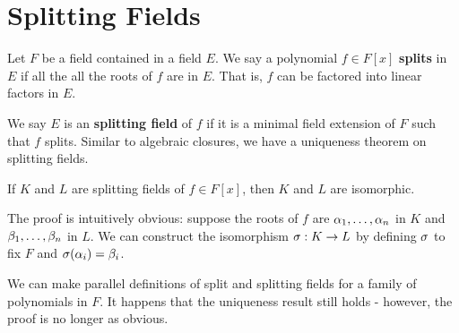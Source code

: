 \section{Splitting Fields}
Let $F$ be a field contained in a field $E$. We say a polynomial $f \in F[x]$ \textbf{splits} in $E$ if all the all the roots of $f$ are in $E$. That is, $f$ can be factored into linear factors in $E$.

We say $E$ is an \textbf{splitting field} of $f$ if it is a minimal field extension of $F$ such that $f$ splits. Similar to algebraic closures, we have a uniqueness theorem on splitting fields.
\begin{center}
    If $K$ and $L$ are splitting fields of $f \in F[x]$, then $K$ and $L$ are isomorphic.
\end{center}
The proof is intuitively obvious: suppose the roots of $f$ are $\alpha_1, \dots, \alpha_n$ in $K$ and $\beta_1, \dots, \beta_n$ in $L$. We can construct the isomorphism $\sigma: K \rightarrow L$ by defining $\sigma$ to fix $F$ and $\sigma(\alpha_i) = \beta_i$.

We can make parallel definitions of split and splitting fields for a family of polynomials in $F$. It happens that the uniqueness result still holds - however, the proof is no longer as obvious.
